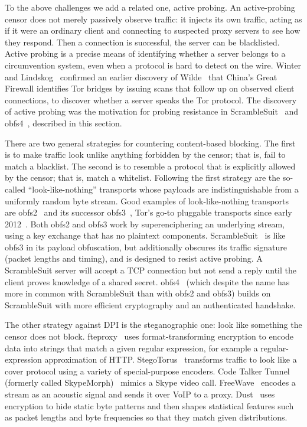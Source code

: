 \documentclass[conference]{IEEEtran}
\begin{document}
To the above challenges we add a related one, active probing.
An active-probing censor does not merely passively observe traffic:
it injects its own traffic,
acting as if it were an ordinary client and connecting to suspected
proxy servers to see how they respond.
Then a connection is successful, the server can be blacklisted.
Active probing is a precise means of identifying whether a server belongs to a circumvention system,
even when a protocol is hard to detect on the wire.
Winter and Lindskog~\cite{foci12-winter} confirmed an earlier discovery of
Wilde~\cite{wilde} that China's Great Firewall identifies Tor bridges
by issuing scans that follow up on observed client connections, to discover
whether a server speaks the Tor protocol.
The discovery of active probing was the motivation for probing resistance in ScrambleSuit~\cite{scramblesuit}
and obfs4~\cite{obfs4},
described in this section.


There are two general strategies for countering content-based blocking.
The first is to make traffic look unlike
anything forbidden by the censor; that is, fail to match a blacklist. The second is
to resemble a protocol that is explicitly allowed by the censor; that is, match a whitelist.
Following the first strategy are the so-called ``look-like-nothing'' transports whose
payloads are indistinguishable from a uniformly random byte stream.
Good examples of look-like-nothing transports are
obfs2~\cite{obfs2} and its successor obfs3~\cite{obfs3},
Tor's go-to pluggable transports since early 2012~\cite{obfsproxy-arms-race}.
Both obfs2 and obfs3 work by superenciphering an underlying stream,
using a key exchange that has no plaintext components.
ScrambleSuit~\cite{scramblesuit} is like obfs3 in its
payload obfuscation, but additionally obscures its traffic signature
(packet lengths and timing), and is designed to resist active probing.
A ScrambleSuit server will accept a TCP connection but not send a reply
until the client proves knowledge of a shared secret.
obfs4~\cite{obfs4}
(which despite the name has more in common with ScrambleSuit than with obfs2 and obfs3)
builds on ScrambleSuit with more efficient cryptography and an authenticated handshake.

The other strategy against DPI is the steganographic one: look like
something the censor does not block.
fteproxy~\cite{fte} uses format-transforming encryption to encode data into strings
that match a given regular expression,
for example a regular-expression approximation of HTTP.
StegoTorus~\cite{stegotorus}
transforms traffic to look like a cover protocol
using a variety of special-purpose encoders.
Code Talker
Tunnel (formerly called SkypeMorph)~\cite{skypemorph} mimics a Skype video call.
FreeWave~\cite{freewave} encodes a stream as an acoustic signal
and sends it over VoIP to a proxy.
Dust~\cite{dust} uses encryption to hide static byte patterns and then
shapes statistical features such as packet lengths and byte frequencies so that they
match given distributions.
\end{document}
